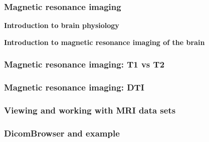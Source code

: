 \documentclass[mathserif, aspectratio=169]{beamer}
\newcommand{\mysection}[1]{\begin{frame} \begin{center} \vspace{3em} \textbf{#1} \end{center} \end{frame}}
\begin{document}
\begin{frame}
  \frametitle{Magnetic resonance imaging}
\end{frame}

\mysection{Introduction to brain physiology}

\mysection{Introduction to magnetic resonance imaging of the brain}

\begin{frame}
  \frametitle{Magnetic resonance imaging: T1 vs T2}
\end{frame}

\begin{frame}
  \frametitle{Magnetic resonance imaging: DTI}
\end{frame}

\begin{frame}
  \frametitle{Viewing and working with MRI data sets}
\end{frame}

\begin{frame}
  \frametitle{DicomBrowser and example}
\end{frame}

\end{document}
